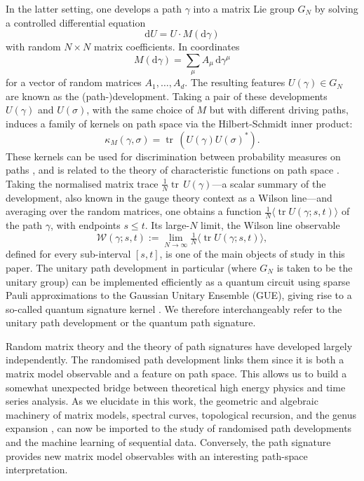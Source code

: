 \documentclass[11pt,a4paper]{article}
\DeclareMathOperator{\tr}{tr}
\newcommand{\cW}{\mathcal{W}}
\newcommand{\dd}{\mathrm{d}}
\begin{document}
In the latter setting, one develops a path $\gamma$ into a matrix Lie group $G_N$ by solving a controlled differential equation 
\begin{equation}\label{eq:def-feature-Z}
\dd U = U\cdot M(\dd\gamma)
\end{equation}
with random $N\times N$ matrix coefficients. In coordinates 
%
\begin{equation}
M(\dd\gamma) = \sum_\mu A_\mu\,\dd\gamma^\mu
\end{equation}
%
for a vector of random matrices
$A_1,\ldots,A_d$. The resulting features $U(\gamma)\in G_N$ are known as the (path-)development. Taking a pair of these developments $U(\gamma)$ and $U(\sigma)$, with the same choice of $M$ but with different driving paths, induces a family of kernels on path space via the Hilbert-Schmidt inner product:
\begin{equation}
\kappa_{M}(\gamma,\sigma)=\tr\, (U(\gamma)U(\sigma)^{*}).
\end{equation}
These kernels can be used for discrimination between probability measures on paths \cite{lou2023pcf}, and is related to the theory of characteristic functions on path space \cite{chevyrev2016characteristic}. Taking the normalised matrix trace $\frac{1}{N}\tr\,U(\gamma)$---a scalar summary of the development, also known in the gauge theory context as a Wilson line---and averaging over the random matrices, one obtains a function $\frac{1}{N}\langle\tr U(\gamma;s,t)\rangle$ of the path $\gamma$, with endpoints $s\le t$. Its large-$N$ limit, the Wilson line observable
\begin{equation}\label{eq:wilson-intro}
  \cW(\gamma;s,t) := \lim_{N\to\infty}\tfrac{1}{N}\bigl\langle\tr U(\gamma;s,t)\bigr\rangle ,
\end{equation}
defined for every sub-interval $[s,t]$, is one of the main objects of study in this paper. The unitary path development in particular (where $G_N$ is taken to be the unitary group) can be implemented efficiently as a quantum circuit using sparse Pauli approximations to the Gaussian Unitary Ensemble (GUE), giving rise to a so-called quantum signature kernel \cite{crew2025quantum}. We therefore interchangeably refer to the unitary path development or the quantum path signature.

Random matrix theory and the theory of path signatures have developed largely independently. The randomised path development links them since it is both a matrix model observable and a feature on path space. This allows us to build a somewhat unexpected bridge between theoretical high energy physics and time series analysis. As we elucidate in this work, the geometric and algebraic machinery of matrix models, spectral curves, topological recursion, and the genus expansion \cite{t1993planar,migdal1983loop,eynard2016counting,eynard2007invariants}, can now be imported to the study of randomised path developments and the machine learning of sequential data. Conversely, the path signature provides new matrix model observables with an interesting path-space interpretation.
\end{document}
